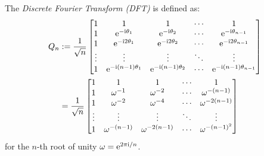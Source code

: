\begin{definition}[DFT] The \emph{Discrete Fourier Transform (DFT)} is defined as:
\begin{align*}
Q_n &:= {1 \over \sqrt{n}} \begin{bmatrix} 1 & 1 & 1&  \ensuremath{\cdots} & 1 \\
                                    1 & {\rm e}^{-\I \ensuremath{\theta}_1} & {\rm e}^{-\I \ensuremath{\theta}_2} & \ensuremath{\cdots} & {\rm e}^{-\I \ensuremath{\theta}_{n-1}} \\
                                    1 & {\rm e}^{-\I 2 \ensuremath{\theta}_1} & {\rm e}^{-\I 2 \ensuremath{\theta}_2} & \ensuremath{\cdots} & {\rm e}^{-\I 2\ensuremath{\theta}_{n-1}} \\
                                    \ensuremath{\vdots} & \ensuremath{\vdots} & \ensuremath{\vdots} & \ensuremath{\ddots} & \ensuremath{\vdots} \\
                                    1 & {\rm e}^{-\I (n-1) \ensuremath{\theta}_1} & {\rm e}^{-\I (n-1) \ensuremath{\theta}_2} & \ensuremath{\cdots} & {\rm e}^{-\I (n-1) \ensuremath{\theta}_{n-1}}
\end{bmatrix} \\
&= {1 \over \sqrt{n}} \begin{bmatrix} 1 & 1 & 1&  \ensuremath{\cdots} & 1 \\
                                    1 & \ensuremath{\omega}^{-1} & \ensuremath{\omega}^{-2} & \ensuremath{\cdots} & \ensuremath{\omega}^{-(n-1)}\\
                                    1 & \ensuremath{\omega}^{-2} & \ensuremath{\omega}^{-4} & \ensuremath{\cdots} & \ensuremath{\omega}^{-2(n-1)}\\
                                    \ensuremath{\vdots} & \ensuremath{\vdots} & \ensuremath{\vdots} & \ensuremath{\ddots} & \ensuremath{\vdots} \\
                                    1 & \ensuremath{\omega}^{-(n-1)} & \ensuremath{\omega}^{-2(n-1)} & \ensuremath{\cdots} & \ensuremath{\omega}^{-(n-1)^2}
\end{bmatrix}
\end{align*}
for the $n$-th root of unity $\omega = {\rm e}^{2\pi{\rm i}/n}$.  \end{definition}

